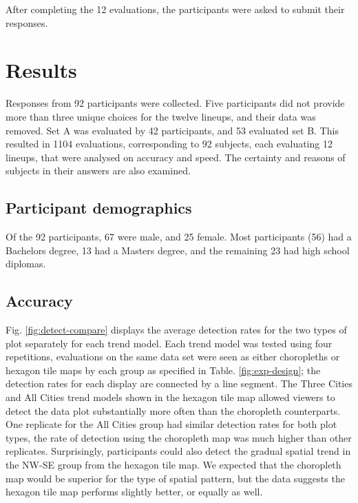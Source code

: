 \documentclass[times, doublespace]{anzsauth}
\begin{document}
After completing the 12 evaluations, the participants were asked to
submit their responses.

\section{Results}\label{results}

Responses from 92 participants were collected. Five participants did not
provide more than three unique choices for the twelve lineups, and their
data was removed. Set A was evaluated by 42 participants, and 53
evaluated set B. This resulted in 1104 evaluations, corresponding to 92
subjects, each evaluating 12 lineups, that were analysed on accuracy and
speed. The certainty and reasons of subjects in their answers are also
examined.

\subsection{Participant demographics}\label{participant-demographics}

Of the 92 participants, 67 were male, and 25 female. Most participants
(56) had a Bachelors degree, 13 had a Masters degree, and the remaining
23 had high school diplomas.

\subsection{Accuracy}\label{accuracy}

Fig. \ref{fig:detect-compare} displays the average detection rates for
the two types of plot separately for each trend model. Each trend model
was tested using four repetitions, evaluations on the same data set were
seen as either choropleths or hexagon tile maps by each group as
specified in Table. \ref{fig:exp-design}; the detection rates for each
display are connected by a line segment. The Three Cities and All Cities
trend models shown in the hexagon tile map allowed viewers to detect the
data plot substantially more often than the choropleth counterparts. One
replicate for the All Cities group had similar detection rates for both
plot types, the rate of detection using the choropleth map was much
higher than other replicates. Surprisingly, participants could also
detect the gradual spatial trend in the NW-SE group from the hexagon
tile map. We expected that the choropleth map would be superior for the
type of spatial pattern, but the data suggests the hexagon tile map
performs slightly better, or equally as well.
\end{document}
